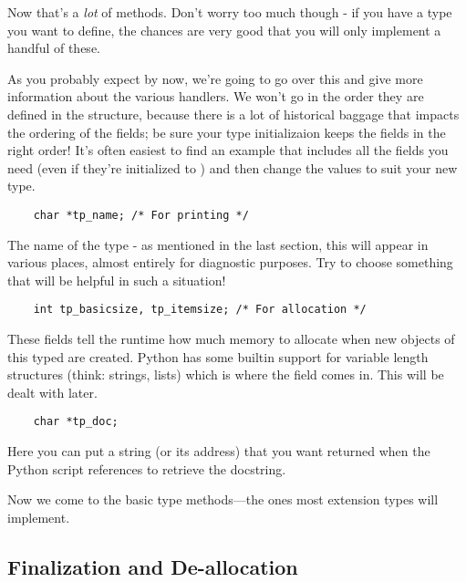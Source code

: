 Now that's a \emph{lot} of methods.  Don't worry too much though - if
you have a type you want to define, the chances are very good that you
will only implement a handful of these.

As you probably expect by now, we're going to go over this and give
more information about the various handlers.  We won't go in the order
they are defined in the structure, because there is a lot of
historical baggage that impacts the ordering of the fields; be sure
your type initializaion keeps the fields in the right order!  It's
often easiest to find an example that includes all the fields you need
(even if they're initialized to ) and then change the values
to suit your new type.

\begin{verbatim}
    char *tp_name; /* For printing */
\end{verbatim}

The name of the type - as mentioned in the last section, this will
appear in various places, almost entirely for diagnostic purposes.
Try to choose something that will be helpful in such a situation!

\begin{verbatim}
    int tp_basicsize, tp_itemsize; /* For allocation */
\end{verbatim}

These fields tell the runtime how much memory to allocate when new
objects of this typed are created.  Python has some builtin support
for variable length structures (think: strings, lists) which is where
the  field comes in.  This will be dealt with
later.

\begin{verbatim}
    char *tp_doc;
\end{verbatim}

Here you can put a string (or its address) that you want returned when
the Python script references  to retrieve the
docstring.
   
Now we come to the basic type methods---the ones most extension types
will implement.


\subsection{Finalization and De-allocation}


